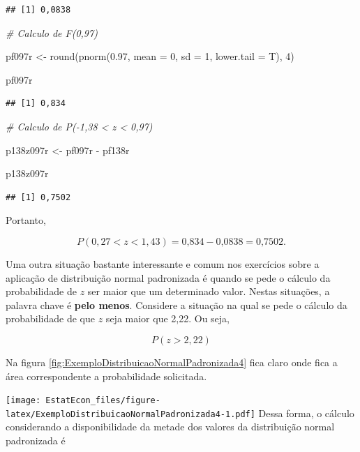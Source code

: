 \documentclass[
]{book}
\newenvironment{Shaded}{\begin{snugshade}}{\end{snugshade}}
\newcommand{\AttributeTok}[1]{\textcolor[rgb]{0.77,0.63,0.00}{#1}}
\newcommand{\CommentTok}[1]{\textcolor[rgb]{0.56,0.35,0.01}{\textit{#1}}}
\newcommand{\DecValTok}[1]{\textcolor[rgb]{0.00,0.00,0.81}{#1}}
\newcommand{\FloatTok}[1]{\textcolor[rgb]{0.00,0.00,0.81}{#1}}
\newcommand{\FunctionTok}[1]{\textcolor[rgb]{0.00,0.00,0.00}{#1}}
\newcommand{\NormalTok}[1]{#1}
\newcommand{\OtherTok}[1]{\textcolor[rgb]{0.56,0.35,0.01}{#1}}
\newcommand{\SpecialCharTok}[1]{\textcolor[rgb]{0.00,0.00,0.00}{#1}}
\begin{document}
\begin{verbatim}
## [1] 0,0838
\end{verbatim}

\begin{Shaded}
\begin{Highlighting}[]
\CommentTok{\# Calculo de F(0,97)}

\NormalTok{pf097r }\OtherTok{\textless{}{-}} \FunctionTok{round}\NormalTok{(}\FunctionTok{pnorm}\NormalTok{(}\FloatTok{0.97}\NormalTok{, }\AttributeTok{mean =} \DecValTok{0}\NormalTok{, }\AttributeTok{sd =} \DecValTok{1}\NormalTok{, }\AttributeTok{lower.tail =}\NormalTok{ T), }
    \DecValTok{4}\NormalTok{)}

\NormalTok{pf097r}
\end{Highlighting}
\end{Shaded}

\begin{verbatim}
## [1] 0,834
\end{verbatim}

\begin{Shaded}
\begin{Highlighting}[]
\CommentTok{\# Calculo de P({-}1,38 \textless{} z \textless{} 0,97)}

\NormalTok{p138z097r }\OtherTok{\textless{}{-}}\NormalTok{ pf097r }\SpecialCharTok{{-}}\NormalTok{ pf138r}


\NormalTok{p138z097r}
\end{Highlighting}
\end{Shaded}

\begin{verbatim}
## [1] 0,7502
\end{verbatim}

Portanto,

\[
  P(0,27 < z < 1,43) = \text{0,834} - \text{0,0838} = \text{0,7502}.
\]

Uma outra situação bastante interessante e comum nos exercícios sobre a aplicação de distribuição normal padronizada é quando se pede o cálculo da probabilidade de \(z\) ser maior que um determinado valor. Nestas situações, a palavra chave é \textbf{pelo menos}. Considere a situação na qual se pede o cálculo da probabilidade de que \(z\) seja maior que 2,22. Ou seja,

\[
P(z > 2,22)
\]

Na figura \ref{fig:ExemploDistribuicaoNormalPadronizada4} fica claro onde fica a área correspondente a probabilidade solicitada.

\texttt{[image: EstatEcon\_files/figure-latex/ExemploDistribuicaoNormalPadronizada4-1.pdf]}
Dessa forma, o cálculo considerando a disponibilidade da metade dos valores da distribuição normal padronizada é
\end{document}
